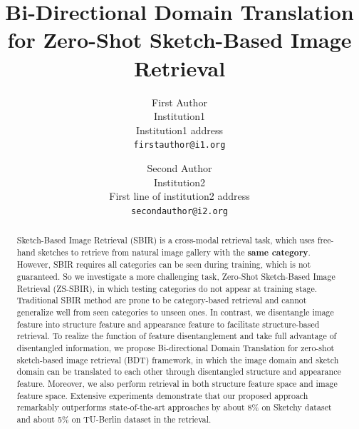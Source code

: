 \documentclass[10pt,twocolumn,letterpaper]{article}
\begin{document}
\title{Bi-Directional Domain Translation for Zero-Shot Sketch-Based Image Retrieval}

\author{First Author\\
Institution1\\
Institution1 address\\
{\tt\small firstauthor@i1.org}
\and
Second Author\\
Institution2\\
First line of institution2 address\\
{\tt\small secondauthor@i2.org}
}

\maketitle

\maketitle

\begin{abstract}
   Sketch-Based Image Retrieval (SBIR) is a cross-modal retrieval task, which uses free-hand sketches to retrieve from natural image gallery with the \textbf{same category}. 
   However, SBIR requires all categories can be seen during training, which is not guaranteed. 
   So we investigate a more challenging task, Zero-Shot Sketch-Based Image Retrieval (ZS-SBIR), in which testing categories do not appear at training stage. 
   Traditional SBIR method are prone to be category-based retrieval and cannot generalize well from seen categories to unseen ones. 
   In contrast, we disentangle image feature into structure feature and appearance feature to facilitate structure-based retrieval.
   To realize the function of feature disentanglement and take full advantage of disentangled information, we propose Bi-directional Domain Translation for zero-shot sketch-based image retrieval (BDT) framework, in which the image domain and sketch domain can be translated to each other through disentangled structure and appearance feature.
   Moreover, we also perform retrieval in both structure feature space and image feature space. 
   Extensive experiments demonstrate that our proposed approach remarkably outperforms state-of-the-art approaches by about 8\% on Sketchy dataset and about 5\% on TU-Berlin dataset in the retrieval.
\end{abstract}
\end{document}
